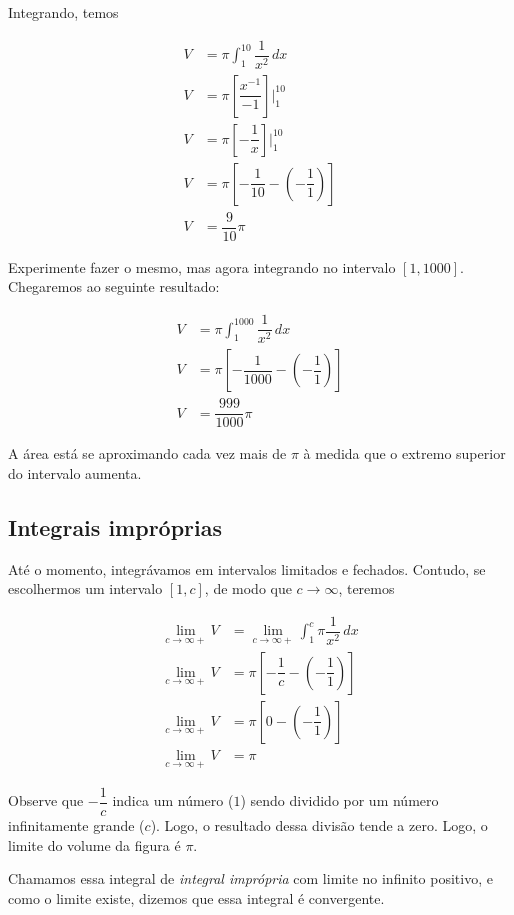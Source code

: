 \documentclass[12pt,openright,twoside,a4paper]{article}
\theoremstyle{definition}
\begin{document}
		Integrando, temos 
		
		\begin{align*}
			V &= \pi \int_{1}^{10} \dfrac{1}{x^2} \, dx\\
			V &=  \pi \left[\dfrac{x^{-1}}{-1}\right]\bigg|_1^{10}\\
			V &=  \pi \left[-\dfrac{1}{x}\right]\bigg|_1^{10}\\
			V &= \pi \left[- \dfrac{1}{10} - \left(- \dfrac{1}{1}\right)\right]\\
			V &=  \dfrac{9}{10}\pi
		\end{align*}
	
	
	Experimente fazer o mesmo, mas agora integrando no intervalo $[1,1000]$. Chegaremos ao seguinte resultado:
	
	\begin{align*}
		V &= \pi \int_{1}^{1000} \dfrac{1}{x^2} \, dx\\
		V &= \pi \left[- \dfrac{1}{1000} - \left(- \dfrac{1}{1}\right)\right]\\
		V &=  \dfrac{999}{1000}\pi
	\end{align*}
	
	A área está se aproximando cada vez mais de $\pi$ à medida que o extremo superior do intervalo aumenta.
	
	\subsection{Integrais impróprias}
	
	Até o momento, integrávamos em intervalos limitados e fechados. Contudo, se escolhermos um intervalo $[1,c]$, de modo que $c \to \infty$, teremos
	
	\begin{align*}
		\lim_{c \to \infty+} V &= \lim_{c \to \infty+}  \int_{1}^{c} \pi \dfrac{1}{x^2} \, dx\\
		\lim_{c \to \infty+} V &= \pi \left[- \dfrac{1}{c} - \left(- \dfrac{1}{1}\right)\right]\\
		\lim_{c \to \infty+} V &= \pi \left[0 - \left(- \dfrac{1}{1}\right)\right]\\
		\lim_{c \to \infty+} V &= \pi 
	\end{align*}
	
	Observe que $- \dfrac{1}{c}$ indica um número ($1$) sendo dividido por um número infinitamente grande ($c$). Logo, o resultado dessa divisão tende a zero. Logo, o limite do volume da figura é $\pi$.
	
	Chamamos essa integral de \textit{integral imprópria} com limite no infinito positivo, e como o limite existe, dizemos que essa integral é convergente.
	
	\newpage
	\printbibliography
\end{document}
